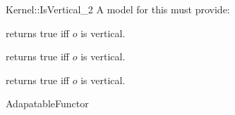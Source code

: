 \begin{ccRefFunctionObjectConcept}{Kernel::IsVertical_2}
A model for this must provide:


{returns true iff $o$ is vertical.}

{returns true iff $o$ is vertical.}

{returns true iff $o$ is vertical.}

\ccRefines
AdapatableFunctor

\ccSeeAlso
{} \\
 \\
 \\

\end{ccRefFunctionObjectConcept}
